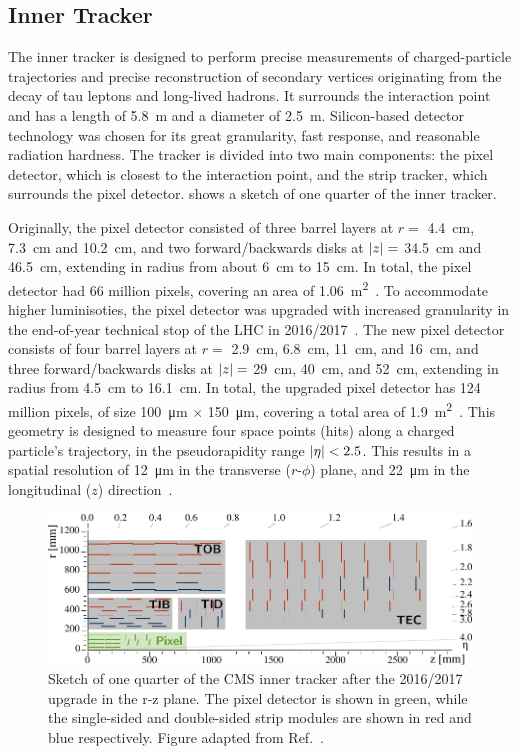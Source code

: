 \subsection{Inner Tracker}
The inner tracker is designed to perform precise measurements of charged-particle trajectories and precise reconstruction of secondary vertices originating from the decay of tau leptons and long-lived hadrons. It surrounds the interaction point and has a length of 5.8~\unit{m} and a diameter of 2.5~\unit{m}. Silicon-based detector technology was chosen for its great granularity, fast response, and reasonable radiation hardness. The tracker is divided into two main components: the pixel detector, which is closest to the interaction point, and the strip tracker, which surrounds the pixel detector.  shows a sketch of one quarter of the inner tracker.

Originally, the pixel detector consisted of three barrel layers at $r=$ 4.4~\unit{cm}, 7.3~\unit{cm} and 10.2~\unit{cm}, and two forward/backwards disks at $\lvert z \rvert=$ 34.5~\unit{cm} and 46.5~\unit{cm}, extending in radius from about 6~\unit{cm} to 15~\unit{cm}. In total, the pixel detector had 66 million pixels, covering an area of 1.06~\unit{m^2}~\cite{CMS:2008xjf}. To accommodate higher luminisoties, the pixel detector was upgraded with increased granularity in the end-of-year technical stop of the LHC in 2016/2017~\cite{CMS:2012sda}. The new pixel detector consists of four barrel layers at $r=$ 2.9~\unit{cm}, 6.8~\unit{cm}, 11~\unit{cm}, and 16~\unit{cm}, and three forward/backwards disks at $\lvert z \rvert=$ 29~\unit{cm}, 40~\unit{cm}, and 52~\unit{cm}, extending in radius from 4.5~\unit{cm} to 16.1~\unit{cm}. In total, the upgraded pixel detector has 124 million pixels, of size 100~\unit{\micro m} $\times$ 150~\unit{\micro m}, covering a total area of 1.9~\unit{m^2}~\cite{CMSTrackerGroup:2020edz}. This geometry is designed to measure four space points (hits) along a charged particle's trajectory, in the pseudorapidity range $\lvert \eta \rvert < 2.5$. This results in a spatial resolution of 12~\unit{\micro m} in the transverse ($r$-$\phi$) plane, and 22~\unit{\micro m} in the longitudinal ($z$) direction~\cite{CMSTrackerGroup:2020edz}.

\begin{figure}
  \centering
  \includegraphics[width=\textwidth]{Figures/Detector/CMS/tracker_annotated.pdf}
  \caption[The CMS Inner Tracker]{Sketch of one quarter of the CMS inner tracker after the 2016/2017 upgrade in the r-z plane. The pixel detector is shown in green, while the single-sided and double-sided strip modules are shown in red and blue respectively. Figure adapted from Ref.~\cite{CMS:2017lum}.}\label{fig:tracker}
\end{figure}

